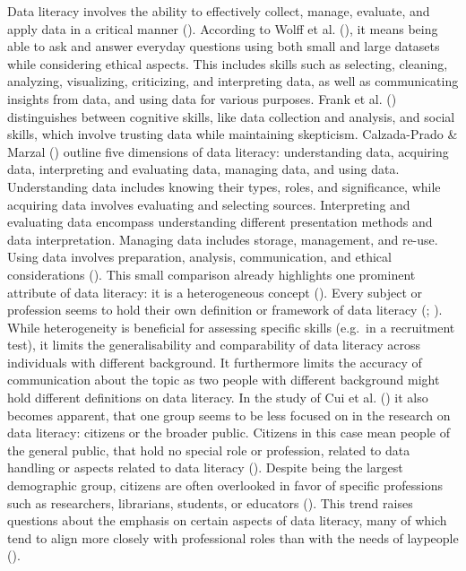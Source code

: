 \documentclass[
  12pt,
  a4paper,
  twoside]{article}
\begin{document}
Data literacy involves the ability to effectively collect, manage, evaluate, and apply data in a critical manner (). According to Wolff et al. (), it means being able to ask and answer everyday questions using both small and large datasets while considering ethical aspects. This includes skills such as selecting, cleaning, analyzing, visualizing, criticizing, and interpreting data, as well as communicating insights from data, and using data for various purposes. Frank et al. () distinguishes between cognitive skills, like data collection and analysis, and social skills, which involve trusting data while maintaining skepticism. Calzada-Prado \& Marzal () outline five dimensions of data literacy: understanding data, acquiring data, interpreting and evaluating data, managing data, and using data. Understanding data includes knowing their types, roles, and significance, while acquiring data involves evaluating and selecting sources. Interpreting and evaluating data encompass understanding different presentation methods and data interpretation. Managing data includes storage, management, and re-use. Using data involves preparation, analysis, communication, and ethical considerations ().
This small comparison already highlights one prominent attribute of data literacy: it is a heterogeneous concept (). Every subject or profession seems to hold their own definition or framework of data literacy (; ). While heterogeneity is beneficial for assessing specific skills (e.g.~in a recruitment test), it limits the generalisability and comparability of data literacy across individuals with different background. It furthermore limits the accuracy of communication about the topic as two people with different background might hold different definitions on data literacy. In the study of Cui et al. () it also becomes apparent, that one group seems to be less focused on in the research on data literacy: citizens or the broader public. Citizens in this case mean people of the general public, that hold no special role or profession, related to data handling or aspects related to data literacy ().
Despite being the largest demographic group, citizens are often overlooked in favor of specific professions such as researchers, librarians, students, or educators (). This trend raises questions about the emphasis on certain aspects of data literacy, many of which tend to align more closely with professional roles than with the needs of laypeople ().
\end{document}
